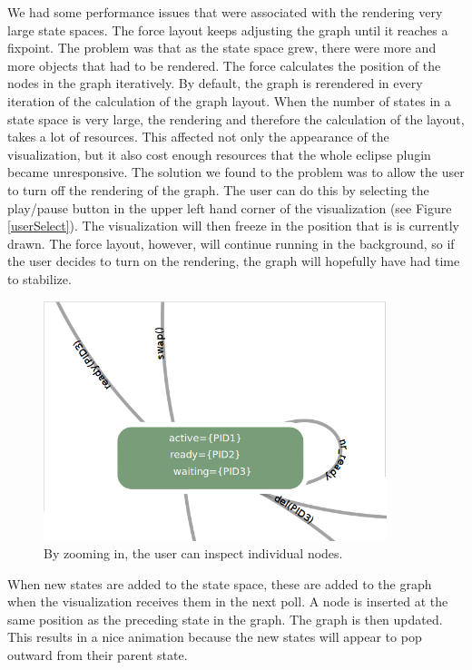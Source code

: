 We had some performance issues that were associated with the rendering very large state spaces. The force layout keeps adjusting the graph until it reaches a fixpoint. The problem was that as the state space grew, there were more and more objects that had to be rendered. The force calculates the position of the nodes in the graph iteratively. By default, the graph is rerendered in every iteration of the calculation of the graph layout. When the number of states in a state space is very large, the rendering and therefore the calculation of the layout, takes a lot of resources. This affected not only the appearance of the visualization, but it also cost enough resources that the whole eclipse plugin became unresponsive. The solution we found to the problem was to allow the user to turn off the rendering of the graph. The user can do this by selecting the play/pause button in the upper left hand corner of the visualization (see Figure \ref{userSelect}). The visualization will then freeze in the position that is is currently drawn. The force layout, however, will continue running in the background, so if the user decides to turn on the rendering, the graph will hopefully have had time to stabilize.

\begin{center}
\begin{figure}[h!]
\centering
\includegraphics[width=10cm]{bilder/onestate.png}
\caption{By zooming in, the user can inspect individual nodes.}
\label{onestate}
\end{figure}
\end{center}

When new states are added to the state space, these are added to the graph when the visualization receives them in the next poll. A node is inserted at the same position as the preceding state in the graph. The graph is then updated. This results in a nice animation because the new states will appear to pop outward from their parent state.

